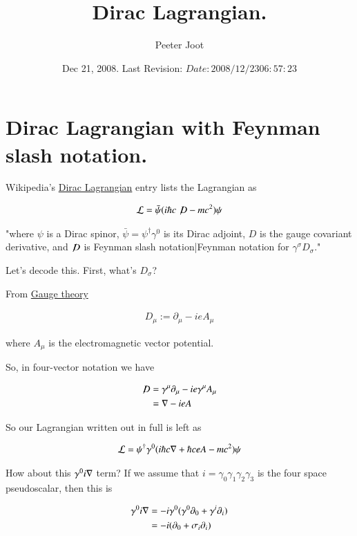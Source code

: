 \documentclass{article}
\title{ Dirac Lagrangian. }
\author{Peeter Joot}
\date{ Dec 21, 2008.  Last Revision: $Date: 2008/12/23 06:57:23 $ }
\newcommand{\Dslash}[0]{ \not\!D }
\begin{document}
\maketitle{}
\tableofcontents

\section{ Dirac Lagrangian with Feynman slash notation. }

Wikipedia's \href{http://en.wikipedia.org/wiki/Lagrangian#Dirac_Lagrangian}{Dirac Lagrangian} entry lists the Lagrangian as

\begin{align*}
\LL = \bar \psi (i \hbar c \Dslash - mc^2) \psi
\end{align*}

"where $\psi\!$ is a Dirac spinor, $\bar \psi = \psi^\dagger \gamma^0$ is its Dirac adjoint, $D\!$ is the gauge covariant derivative, and $\Dslash$ is Feynman slash notation|Feynman notation for $\gamma^\sigma D_\sigma\!$."

Let's decode this.  First, what's $D_\sigma$?

From \href{http://en.wikipedia.org/wiki/Gauge_covariant_derivative}{Gauge theory}

\begin{align*}
D_\mu := \partial_\mu - i e A_\mu
\end{align*}

where $A_\mu$ is the electromagnetic vector potential.

So, in four-vector notation we have

\begin{align*}
\Dslash 
&= \gamma^\mu \partial_\mu - i e \gamma^\mu A_\mu \\
&= \grad - i e A \\
\end{align*}

So our Lagrangian written out in full is left as

\begin{align}\label{eqn:lag1}
\mathcal{L} = \psi^\dagger \gamma^0 ( i \hbar c \nabla + \hbar c e A - mc^2) \psi
\end{align}

How about this $\gamma^0 i \nabla$ term?  If we assume that $i = \gamma_0 \gamma_1 \gamma_2 \gamma_3$ is the four space pseudoscalar, then this is

\begin{align*}
\gamma^0 i \nabla
&= - i \gamma^0 (\gamma^0 \partial_0 + \gamma^i \partial_i) \\
&= - i (\partial_0 + \sigma_i \partial_i) \\
\end{align*}
\end{document}
